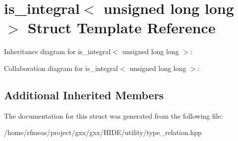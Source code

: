 \hypertarget{structis__integral_3_01unsigned_01long_01long_01_4}{}\section{is\+\_\+integral$<$ unsigned long long $>$ Struct Template Reference}
\label{structis__integral_3_01unsigned_01long_01long_01_4}


Inheritance diagram for is\+\_\+integral$<$ unsigned long long $>$\+:


Collaboration diagram for is\+\_\+integral$<$ unsigned long long $>$\+:
\subsection*{Additional Inherited Members}


The documentation for this struct was generated from the following file\+:\begin{DoxyCompactItemize}
\item 
/home/rfmeas/project/gxx/gxx/\+H\+I\+D\+E/utility/type\+\_\+relation.\+hpp\end{DoxyCompactItemize}
